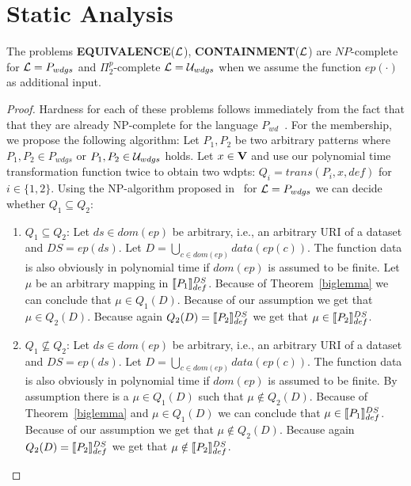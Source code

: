 \section{Static Analysis}
\begin{theorem}
	The problems \textbf{EQUIVALENCE}($\mathcal{L}$), \textbf{CONTAINMENT}($\mathcal{L}$)  
	are $NP$-complete for $\mathcal{L} = P_{wdgs}$ and $\Pi^p_2$-complete $\mathcal{L} =
	\mathcal{U}_{wdgs}$ when we assume the function $ep(\cdot)$ as additional input.
\end{theorem}
\begin{proof}
	Hardness for each of these problems follows immediately from the fact that
	that they are already NP-complete for the language
	$P_{wd}$~\cite{letelier2012static}.
	For the membership, we propose the following algorithm:
	Let $P_1,P_2$ be two arbitrary patterns where $P_1,P_2 \in P_{wdgs}$ or
	$P_1,P_2 \in \mathcal{U}_{wdgs}$ holds.
	Let $x \in \mathbf{V}$ and use our polynomial time transformation function twice to obtain two wdpts: 
	$Q_i = trans(P_i,x,def)$ for $i\in \{1,2\}$. 
	Using the NP-algorithm proposed in~\cite{letelier2012static} for $\mathcal{L} =
	P_{wdgs}$ we can decide whether $Q_1 \subseteq Q_2$:
	\begin{enumerate}
		\item $Q_1 \subseteq Q_2$:
			Let $ds \in dom(ep)$ be arbitrary, i.e., 
			an arbitrary URI of a dataset and $DS = ep(ds)$. 
			Let $D =\bigcup\limits_{c\in dom(ep)} data(ep(c))$. The function data is also
			obviously in polynomial time if $dom(ep)$ is assumed to be finite.
			Let $\mu$ be an arbitrary mapping in $\llbracket P_1 \rrbracket^{DS}_{def}$. Because
			of Theorem~\ref{biglemma} we can conclude that $\mu \in Q_1(D)$.
			Because of our assumption we get that $\mu \in Q_2(D)$. Because
			again $Q_2(D) = \llbracket P_2 \rrbracket^{DS}_{def}$ we get that $\mu \in \llbracket P_2
			\rrbracket^{DS}_{def}$.

		\item $Q_1 \not\subseteq Q_2$: 
			Let $ds \in dom(ep)$ be arbitrary, i.e., an arbitrary URI of a dataset 
			and $DS = ep(ds)$.
			Let $D =\bigcup\limits_{c\in dom(ep)} data(ep(c))$. The function data is also
			obviously in polynomial time if $dom(ep)$ is assumed to be finite.
			By assumption there is a $\mu \in
			Q_1(D)$ such that $\mu \notin Q_2(D)$. Because
			of Theorem~\ref{biglemma} and $\mu \in Q_1(D)$ we can conclude that $\mu \in \llbracket P_1
			\rrbracket^{DS}_{def}$.
			Because of our assumption we get that $\mu \notin Q_2(D)$. Because
			again $Q_2(D) = \llbracket P_2 \rrbracket^{DS}_{def}$ we get that $\mu \notin \llbracket P_2
			\rrbracket^{DS}_{def}$.
	\end{enumerate}
\end{proof}
